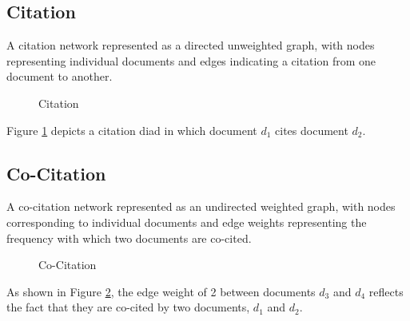
\subsection{Citation}

A citation network represented as a directed unweighted graph, with nodes representing individual 
documents and edges indicating a citation from one document to another.

\begin{figure}[H]
    \centering
    \caption{Citation} \label{fig:citation}
\end{figure}

Figure \ref{fig:citation} depicts a citation diad in which document $d_1$ cites document $d_2$.

\subsection{Co-Citation}

A co-citation network represented as an undirected weighted graph, with nodes corresponding to 
individual documents and edge weights representing the frequency with which two documents are 
co-cited.

\begin{figure}[H]
    \centering
    \caption{Co-Citation} \label{fig:co_citation}
\end{figure}

As shown in Figure \ref{fig:co_citation}, the edge weight of 2 between documents $d_3$ and $d_4$ reflects 
the fact that they are co-cited by two documents, $d_1$ and $d_2$.

